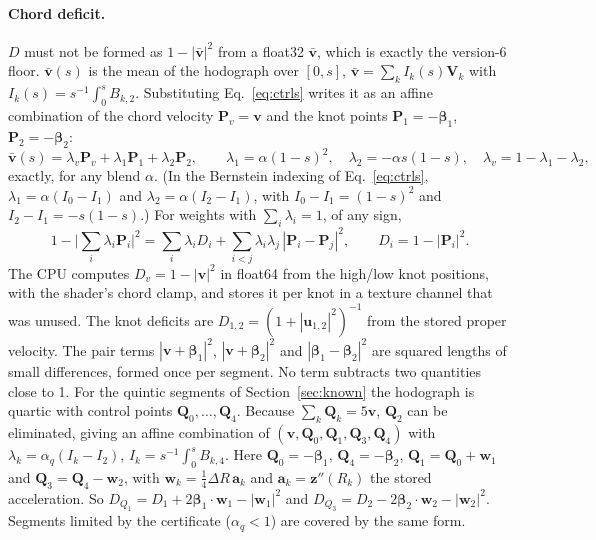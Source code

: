 \documentclass[11pt, a4paper]{article}
\begin{document}
\paragraph{Chord deficit.} $D$ must not be formed as $1 - |\bar{\mathbf{v}}|^2$ from a float32 $\bar{\mathbf{v}}$, which is exactly the version-6 floor. $\bar{\mathbf{v}}(s)$ is the mean of the hodograph over $[0, s]$, $\bar{\mathbf{v}} = \sum_k I_k(s)\mathbf{V}_k$ with $I_k(s) = s^{-1}\!\int_0^s B_{k,2}$. Substituting Eq.~\eqref{eq:ctrls} writes it as an affine combination of the chord velocity $\mathbf{P}_v = \mathbf{v}$ and the knot points $\mathbf{P}_1 = -\boldsymbol{\beta}_1$, $\mathbf{P}_2 = -\boldsymbol{\beta}_2$:
\begin{equation}
\bar{\mathbf{v}}(s) = \lambda_v \mathbf{P}_v + \lambda_1 \mathbf{P}_1 + \lambda_2 \mathbf{P}_2, \qquad \lambda_1 = \alpha(1 - s)^2, \quad \lambda_2 = -\alpha s(1 - s), \quad \lambda_v = 1 - \lambda_1 - \lambda_2,
\label{eq:affine}
\end{equation}
exactly, for any blend $\alpha$. (In the Bernstein indexing of Eq.~\eqref{eq:ctrls}, $\lambda_1 = \alpha(I_0 - I_1)$ and $\lambda_2 = \alpha(I_2 - I_1)$, with $I_0 - I_1 = (1-s)^2$ and $I_2 - I_1 = -s(1-s)$.) For weights with $\sum_i \lambda_i = 1$, of any sign,
\begin{equation}
1 - \Big|\sum_i \lambda_i \mathbf{P}_i\Big|^2 = \sum_i \lambda_i D_i + \sum_{i<j} \lambda_i\lambda_j\, |\mathbf{P}_i - \mathbf{P}_j|^2, \qquad D_i = 1 - |\mathbf{P}_i|^2 .
\label{eq:deficit}
\end{equation}
The CPU computes $D_v = 1 - |\mathbf{v}|^2$ in float64 from the high/low knot positions, with the shader's chord clamp, and stores it per knot in a texture channel that was unused. The knot deficits are $D_{1,2} = (1 + |\mathbf{u}_{1,2}|^2)^{-1}$ from the stored proper velocity. The pair terms $|\mathbf{v} + \boldsymbol{\beta}_1|^2$, $|\mathbf{v} + \boldsymbol{\beta}_2|^2$ and $|\boldsymbol{\beta}_1 - \boldsymbol{\beta}_2|^2$ are squared lengths of small differences, formed once per segment. No term subtracts two quantities close to 1. For the quintic segments of Section~\ref{sec:known} the hodograph is quartic with control points $\mathbf{Q}_0, \dots, \mathbf{Q}_4$. Because $\sum_k \mathbf{Q}_k = 5\mathbf{v}$, $\mathbf{Q}_2$ can be eliminated, giving an affine combination of $(\mathbf{v}, \mathbf{Q}_0, \mathbf{Q}_1, \mathbf{Q}_3, \mathbf{Q}_4)$ with $\lambda_k = \alpha_q(I_k - I_2)$, $I_k = s^{-1}\!\int_0^s B_{k,4}$. Here $\mathbf{Q}_0 = -\boldsymbol{\beta}_1$, $\mathbf{Q}_4 = -\boldsymbol{\beta}_2$, $\mathbf{Q}_1 = \mathbf{Q}_0 + \mathbf{w}_1$ and $\mathbf{Q}_3 = \mathbf{Q}_4 - \mathbf{w}_2$, with $\mathbf{w}_k = \tfrac14\Delta R\,\mathbf{a}_k$ and $\mathbf{a}_k = \mathbf{z}''(R_k)$ the stored acceleration. So $D_{Q_1} = D_1 + 2\boldsymbol{\beta}_1\cdot\mathbf{w}_1 - |\mathbf{w}_1|^2$ and $D_{Q_3} = D_2 - 2\boldsymbol{\beta}_2\cdot\mathbf{w}_2 - |\mathbf{w}_2|^2$. Segments limited by the certificate ($\alpha_q < 1$) are covered by the same form.
\end{document}

